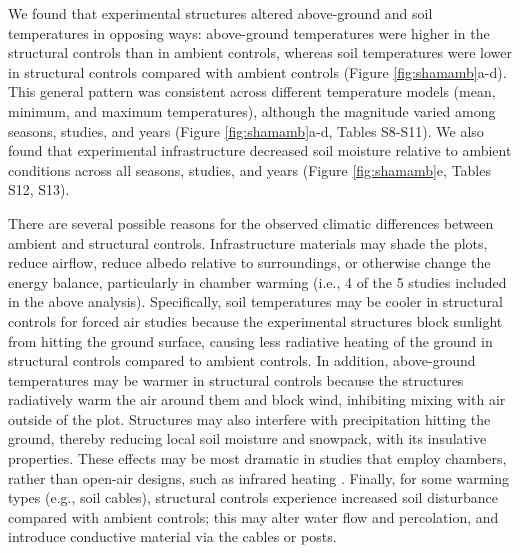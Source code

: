 \documentclass{article}
\begin{document}
\par We found that experimental structures altered above-ground and soil temperatures in opposing ways: above-ground temperatures were higher in the structural controls than in ambient controls, whereas soil temperatures were lower in structural controls compared with ambient controls (Figure \ref{fig:shamamb}a-d). This general pattern was consistent across different temperature models (mean, minimum, and maximum temperatures), although the magnitude varied among seasons, studies, and years (Figure \ref{fig:shamamb}a-d, Tables S8-S11). We also found that experimental infrastructure decreased soil moisture relative to ambient conditions across all seasons, studies, and years (Figure \ref{fig:shamamb}e, Tables S12, S13). 
\par There are several possible reasons for the observed climatic differences between ambient and structural controls. Infrastructure materials may shade the plots, reduce airflow, reduce albedo relative to surroundings, or otherwise change the energy balance, particularly in chamber warming (i.e., 4 of the 5 studies included in the above analysis). Specifically, soil temperatures may be cooler in structural controls for forced air studies because the experimental structures block sunlight from hitting the ground surface, causing less radiative heating of the ground in structural controls compared to ambient controls. In addition, above-ground temperatures may be warmer in structural controls because the structures radiatively warm the air around them and block wind, inhibiting mixing with air outside of the plot. Structures may also interfere with precipitation hitting the ground, thereby reducing local soil moisture and snowpack, with its insulative properties. These effects may be most dramatic in studies that employ chambers, rather than open-air designs, such as infrared heating \citep{aronson2009}. Finally, for some warming types (e.g., soil cables), structural controls experience increased soil disturbance compared with ambient controls; this may alter water flow and percolation, and introduce conductive material via the cables or posts. 
\end{document}
